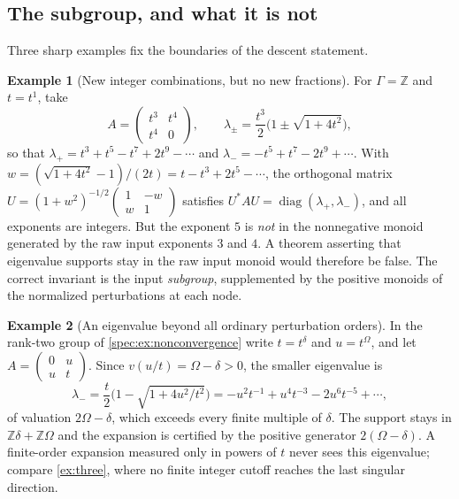 \documentclass[11pt,a4paper]{article}
\numberwithin{equation}{section}
\theoremstyle{definition}
\newtheorem{example}[example]{Example}
\theoremstyle{remark}
\newcommand{\Z}{\mathbb Z}
\newcommand{\diag}{\operatorname{diag}}
\begin{document}
\subsection{The subgroup, and what it is not}

Three sharp examples fix the boundaries of the descent statement.

\begin{example}[New integer combinations, but no new fractions]\label{spec:ex:monoid}
For $\Gamma=\Z$ and $t=t^1$, take
\begin{equation}\label{spec:eq:t3matrix}
 A=\begin{pmatrix}t^3&t^4\\t^4&0\end{pmatrix},
 \qquad
 \lambda_\pm=\frac{t^3}{2}\bigl(1\pm\sqrt{1+4t^2}\bigr),
\end{equation}
so that
$\lambda_+=t^3+t^5-t^7+2t^9-\cdots$ and
$\lambda_-=-t^5+t^7-2t^9+\cdots$. With
$w=(\sqrt{1+4t^2}-1)/(2t)=t-t^3+2t^5-\cdots$, the orthogonal matrix
$U=(1+w^2)^{-1/2}\left(\begin{smallmatrix}1&-w\\w&1\end{smallmatrix}\right)$
satisfies $U^*AU=\diag(\lambda_+,\lambda_-)$, and all exponents are
integers. But the exponent $5$ is \emph{not} in the nonnegative monoid
generated by the raw input exponents $3$ and $4$. A theorem asserting that
eigenvalue supports stay in the raw input monoid would therefore be false.
The correct invariant is the input \emph{subgroup}, supplemented by the
positive monoids of the normalized perturbations at each node.
\end{example}

\begin{example}[An eigenvalue beyond all ordinary perturbation orders]\label{spec:ex:beyond}
In the rank-two group of \cref{spec:ex:nonconvergence} write $t=t^\delta$
and $u=t^\Omega$, and let
$A=\left(\begin{smallmatrix}0&u\\u&t\end{smallmatrix}\right)$. Since
$v(u/t)=\Omega-\delta>0$, the smaller eigenvalue is
\[
 \lambda_-=\frac t2\bigl(1-\sqrt{1+4u^2/t^2}\bigr)
 =-u^2t^{-1}+u^4t^{-3}-2u^6t^{-5}+\cdots,
\]
of valuation $2\Omega-\delta$, which exceeds every finite multiple of
$\delta$. The support stays in $\Z\delta+\Z\Omega$ and the expansion is
certified by the positive generator $2(\Omega-\delta)$. A finite-order
expansion measured only in powers of $t$ never sees this eigenvalue; compare
\cref{ex:three}, where no finite integer cutoff reaches the last singular
direction.
\end{example}
\end{document}
